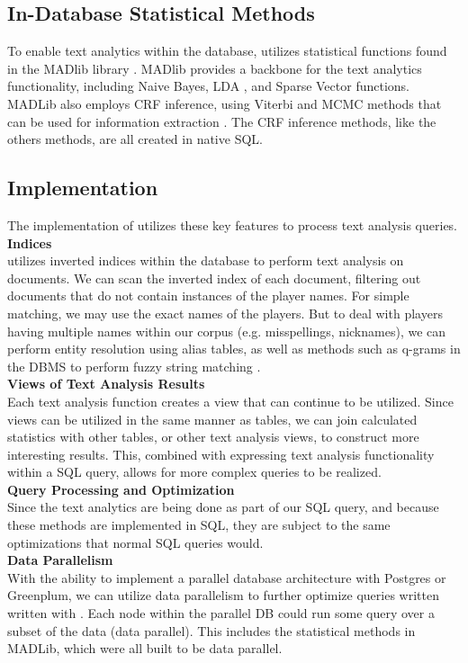 \subsection{In-Database Statistical Methods}
To enable text analytics within the database, {\system} utilizes statistical
functions found in the MADlib library \cite{Cohen:2009:MSN:1687553.1687576}.
MADlib provides a backbone for the text analytics functionality, including
Naive Bayes, LDA \cite{Blei:2003:LDA:944919.944937}, and Sparse Vector
functions. MADLib also employs CRF inference, using Viterbi and
MCMC methods that can be used for information extraction 
\cite{wang2011hybrid}. The CRF inference methods, like the others methods, are
all created in native SQL.


\subsection{{\system} Implementation}
The implementation of {\system} utilizes these key features to process 
text analysis queries.\\

\noindent
\textbf{Indices}\\
{\system} utilizes inverted indices within the database to perform text
analysis on documents. We can scan the inverted index of each 
document, filtering
out documents that do not contain instances of the player names.
For simple matching, we may use the exact names of the players. But to
deal with players having multiple names within our corpus (e.g. misspellings,
nicknames), we can perform entity
resolution using alias tables, as well as methods such as q-grams in the DBMS to perform fuzzy string
matching \cite{Jain:2009:BQO:1519103.1519108}.\\

\noindent
\textbf{Views of Text Analysis Results}\\
Each text analysis function creates a view that can continue to be utilized.
Since views can be utilized in the same manner as tables, we can join calculated
statistics with other tables, or other text analysis views, to construct more
interesting results. This, combined with expressing text analysis functionality
within a SQL query, allows for more complex queries to be realized. \\

\noindent
\textbf{Query Processing and Optimization} \\
Since the text analytics are being done as part of our SQL query, and because
these methods are implemented in SQL, they are subject to the same optimizations
that normal SQL queries would. \\

\noindent
\textbf{Data Parallelism}\\
With the ability to implement a parallel database architecture with Postgres or 
Greenplum, we can utilize data parallelism to further optimize queries written
written with {\system}. Each node within the parallel DB could run some query
over a subset of the data (data parallel). This includes the statistical methods
in MADLib, which were all built to be data parallel.



